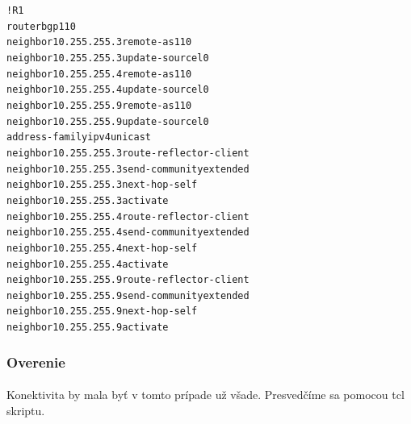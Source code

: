 \documentclass[12pt,twoside,a4paper]{report}
\begin{document}
\noindent
{\selectfont
\begin{small}
\begin{alltt}
!R1
router bgp 110
  neighbor 10.255.255.3 remote-as 110
  neighbor 10.255.255.3 update-source l0
  neighbor 10.255.255.4 remote-as 110
  neighbor 10.255.255.4 update-source l0
  neighbor 10.255.255.9 remote-as 110
  neighbor 10.255.255.9 update-source l0
  address-family ipv4 unicast
    neighbor 10.255.255.3 route-reflector-client
    neighbor 10.255.255.3 send-community extended
    neighbor 10.255.255.3 next-hop-self
    neighbor 10.255.255.3 activate
    neighbor 10.255.255.4 route-reflector-client
    neighbor 10.255.255.4 send-community extended
    neighbor 10.255.255.4 next-hop-self
    neighbor 10.255.255.4 activate
    neighbor 10.255.255.9 route-reflector-client
    neighbor 10.255.255.9 send-community extended
    neighbor 10.255.255.9 next-hop-self
    neighbor 10.255.255.9 activate 
\end{alltt}
\end{small}
}

\subsubsection{Overenie}
\paragraph{}
Konektivita by mala byť v tomto prípade už všade. Presvedčíme sa pomocou tcl skriptu.
\end{document}
